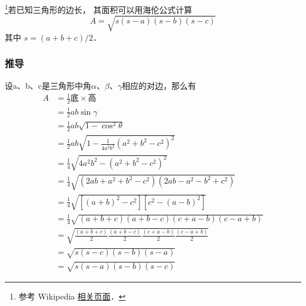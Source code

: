 
\footnote{参考 Wikipedia \href{https://en.wikipedia.org/wiki/Heron's_formula}{相关页面}．}若已知三角形的边长， 其面积可以用海伦公式计算
\begin{equation}
A = \sqrt{s(s-a)(s-b)(s-c)}
\end{equation}
其中 $s = (a+b+c)/2$．
\subsubsection{推导}
设a、b、c是三角形中角$\alpha$、$\beta$、$\gamma$相应的对边，那么有
\begin{equation}
\begin{aligned}
A&=\frac{1}{2}\text{底}\times\text{高}\\
&=\frac{1}{2}ab\sin\gamma\\
&=\frac{1}{2}ab\sqrt{1-\cos^2\theta}\\
&=\frac{1}{2}ab\sqrt{1-\frac{1}{4a^2b^2}(a^2+b^2-c^2)^2}\\
&=\frac{1}{4}\sqrt{4a^2b^2-(a^2+b^2-c^2)^2}\\
&=\frac{1}{4}\sqrt{(2ab+a^2+b^2-c^2)(2ab-a^2-b^2+c^2)}\\
&=\frac{1}{4}\sqrt{[(a+b)^2-c^2][c^2-(a-b)^2]}\\
&=\frac{1}{4}\sqrt{(a+b+c)(a+b-c)(c+a-b)(c-a+b)}\\
&=\sqrt{\frac{(a+b+c)}{2}\frac{(a+b-c)}{2}\frac{(c+a-b)}{2}\frac{(c-a+b)}{2}}\\
&=\sqrt{s(s-c)(s-b)(s-a)}\\
&=\sqrt{s(s-a)(s-b)(s-c)}
\end{aligned}
\end{equation}
